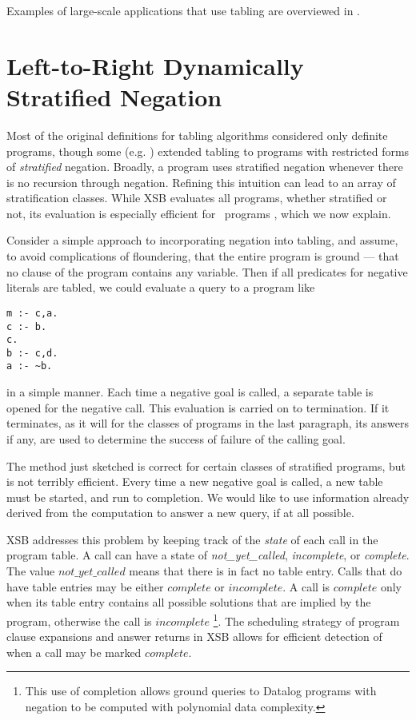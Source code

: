 Examples of large-scale applications that use tabling are overviewed
in \cite{Swif99a}.

\section{Left-to-Right Dynamically Stratified Negation}

Most of the original definitions for tabling algorithms considered
only definite programs, though some (e.g. \cite{KeTo88,Seki89})
extended tabling to programs with restricted forms of {\em stratified}
negation.  Broadly, a program uses stratified negation whenever there
is no recursion through negation.  Refining this intuition can lead to
an array of stratification classes.  While XSB evaluates all programs,
whether stratified or not, its evaluation is especially efficient for
\LRD\ programs \cite{SaSW95a}, which we now explain.

Consider a simple approach to incorporating negation into tabling, and
assume, to avoid complications of floundering, that the entire program
is ground --- that no clause of the program contains any variable.
Then if all predicates for negative literals are tabled, we could
evaluate a query to a program like
\begin{center}
\begin{minipage}{1.5in}
\begin{verbatim}
m :- c,a.
c :- b.
c.
b :- c,d.
a :- ~b.
\end{verbatim}
\end{minipage}
\end{center}
in a simple manner. Each time a negative goal is called, a separate
table is opened for the negative call.  This evaluation is carried on
to termination.  If it terminates, as it will for the classes of
programs in the last paragraph, its answers if any, are used to
determine the success of failure of the calling goal. 

The method just sketched is correct for certain classes of stratified
programs, but is not terribly efficient.  Every time a new negative
goal is called, a new table must be started, and run to completion.
We would like to use information already derived from the computation
to answer a new query, if at all possible.

XSB addresses this problem by keeping track of the {\em state} of each
call in the program table.  A call can have a state of {\em
not\_yet\_called}, {\em incomplete}, or {\em complete}.  The value
$not\_yet\_called$ means that there is in fact no table entry.  Calls
that do have table entries may be either $complete$ or $incomplete$.
A call is $complete$ only when its table entry contains all possible
solutions that are implied by the program, otherwise the call is
$incomplete$
%
\footnote{This use of completion allows ground queries to
Datalog programs with negation to be computed with polynomial data
complexity.}.
%
The scheduling strategy of program clause expansions and answer
returns in XSB allows for efficient detection of when a call may be
marked $complete$.

